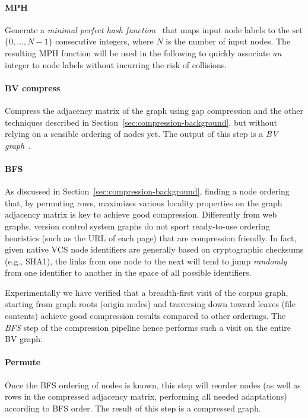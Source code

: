 \paragraph{MPH}
Generate a \emph{minimal perfect hash function}~\cite{GOVFSCF} that maps input
node labels to the set $\{0,\ldots,N-1\}$ consecutive integers, where $N$ is
the number of input nodes. The resulting MPH function will be used in the
following to quickly associate \emph{an} integer to node labels without
incurring the risk of collisions.

\paragraph{BV compress}
Compress the adjacency matrix of the graph using gap compression and the other
techniques described in Section~\ref{sec:compression-background}, but without
relying on a sensible ordering of nodes yet. The output of this step is a
\emph{BV graph}~\cite{BoVWFI}.

\paragraph{BFS}
As discussed in Section~\ref{sec:compression-background}, finding a node
ordering that, by permuting rows, maximizes various locality properties on the
graph adjacency matrix is key to achieve good compression. Differently from web
graphs, version control system graphs do not sport ready-to-use ordering
heuristics (such as the URL of each page) that are compression friendly. In
fact, given native VCS node identifiers are generally based on cryptographic
checksums (e.g., SHA1), the links from one node to the next will tend to jump
\emph{randomly} from one identifier to another in the space of all possible
identifiers.

Experimentally we have verified that a breadth-first visit of the corpus graph,
starting from graph roots (origin nodes) and traversing down toward leaves
(file contents) achieve good compression results compared to other orderings.
The \emph{BFS} step of the compression pipeline hence performs such a visit on
the entire BV graph.

\paragraph{Permute}
Once the BFS ordering of nodes is known, this step will reorder nodes (as well
as rows in the compressed adjacency matrix, performing all needed adaptations)
according to BFS order. The result of this step is a compressed graph.

